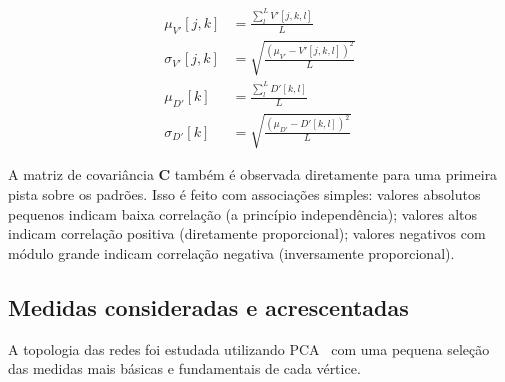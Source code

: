 \documentclass[a4paper,openright,12pt]{report} %
\begin{document}
\begin{align}\label{eq:pca}
\mu_{V'}[j,k]   &=\frac{\sum_l^L V'[j,k,l]}{L}\nonumber\\
\sigma_{V'}[j,k]&=\sqrt{\frac{(\mu_{V'}-V'[j,k,l])^2}{L}}\\\nonumber
\mu_{D'}[k]&=\frac{\sum_l^L D'[k,l]}{L}\\\nonumber
\sigma_{D'}[k]&=\sqrt{\frac{(\mu_{D'}-D'[k,l])^2}{L}}
\end{align}

A matriz de covariância $\mathbf{C}$ também é observada diretamente para
uma primeira pista sobre os padrões. Isso é feito com associações simples: valores absolutos pequenos indicam baixa correlação (a princípio independência); valores altos indicam correlação positiva (diretamente proporcional);
valores negativos com módulo grande indicam correlação negativa (inversamente proporcional).

\subsection{Medidas consideradas e acrescentadas}\label{sec:med}
A topologia das redes foi estudada utilizando PCA~\cite{pca}
com uma pequena seleção das medidas mais básicas e fundamentais de cada vértice. 
%
\end{document}
